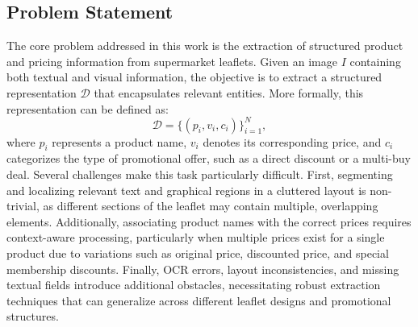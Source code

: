 \documentclass[11pt]{article}
\begin{document}
\subsection{Problem Statement}

The core problem addressed in this work is the extraction of structured product and pricing information from supermarket leaflets. Given an image $I$ containing both textual and visual information, the objective is to extract a structured representation $\mathcal{D}$ that encapsulates relevant entities. More formally, this representation can be defined as:
\begin{equation}
    \mathcal{D} = \{ (p_i, v_i, c_i) \}_{i=1}^{N},
\end{equation}
where $p_i$ represents a product name, $v_i$ denotes its corresponding price, and $c_i$ categorizes the type of promotional offer, such as a direct discount or a multi-buy deal. Several challenges make this task particularly difficult. First, segmenting and localizing relevant text and graphical regions in a cluttered layout is non-trivial, as different sections of the leaflet may contain multiple, overlapping elements. Additionally, associating product names with the correct prices requires context-aware processing, particularly when multiple prices exist for a single product due to variations such as original price, discounted price, and special membership discounts. Finally, OCR errors, layout inconsistencies, and missing textual fields introduce additional obstacles, necessitating robust extraction techniques that can generalize across different leaflet designs and promotional structures.


\end{document}
